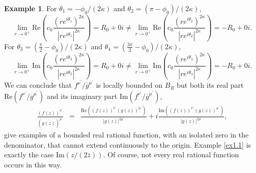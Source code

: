 \documentclass[12pt]{amsart}
\theoremstyle{definition}
\newtheorem{example}[thm]{Example}
\theoremstyle{remark}
\numberwithin{equation}{section}
\newcommand{\z}{\bar z}
\newcommand{\rp}{\mbox{Re}}
\newcommand{\ip}{\mbox{Im}}
\begin{document}
\begin{example}
  For $\theta_1=-\phi_0/(2\kappa)$ and $\theta_2=(\pi-\phi_0)/(2\kappa)$, $$\lim_{r\to0^+}\rp\left(c_0\frac{(re^{i\theta_1})^{2\kappa}}{|re^{i\theta_1}|^{2\kappa}}\right)=R_0+0i\ne\lim_{r\to0^+}\rp\left(c_0\frac{(re^{i\theta_2})^{2\kappa}}{|re^{i\theta_2}|^{2\kappa}}\right)=-R_0+0i.$$
  For $\theta_3=(\frac{\pi}2-\phi_0)/(2\kappa)$ and $\theta_4=(\frac{3\pi}2-\phi_0)/(2\kappa)$, $$\lim_{r\to0^+}\ip\left(c_0\frac{(re^{i\theta_3})^{2\kappa}}{|re^{i\theta_3}|^{2\kappa}}\right)=R_0+0i\ne\lim_{r\to0^+}\ip\left(c_0\frac{(re^{i\theta_4})^{2\kappa}}{|re^{i\theta_4}|^{2\kappa}}\right)=-R_0+0i.$$
  We can conclude that $f^{\nu^\prime}/\overline{g}^{\mu^\prime}$ is locally bounded on $B_R$ but both its real part $\rp(f^{\nu^\prime}/\overline{g}^{\mu^\prime})$ and its imaginary part $\ip(f^{\nu^\prime}/\overline{g}^{\mu^\prime})$,
 \begin{eqnarray*}
      \frac{(f(z))^{\nu^\prime}}{\left(\overline{g(z)}\right)^{\mu^\prime}}&=&\frac{\rp\left((f(z))^{\nu^\prime}(g(z))^{\mu^\prime}\right)}{|g(z)|^{2{\mu^\prime}}}+i\frac{\ip\left((f(z))^{\nu^\prime}(g(z))^{\mu^\prime}\right)}{|g(z)|^{2{\mu^\prime}}},
  \end{eqnarray*}
  give examples of a bounded real rational function, with an isolated zero in the denominator, that cannot extend continuously to the origin.  Example \ref{ex1.1} is exactly the case $\ip(z/(2\z))$.  Of course, not every real rational function occurs in this way.
\end{example}
 
\end{document}
